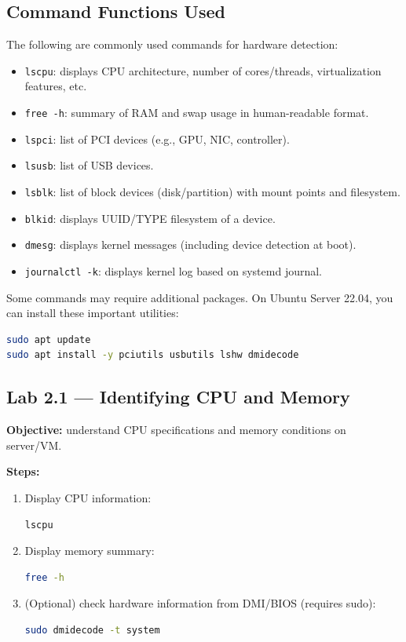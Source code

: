 \subsection*{Command Functions Used}
The following are commonly used commands for hardware detection:
\begin{itemize}
    \item \texttt{lscpu}: displays CPU architecture, number of cores/threads, virtualization features, etc.
    \item \texttt{free -h}: summary of RAM and swap usage in human-readable format.
    \item \texttt{lspci}: list of PCI devices (e.g., GPU, NIC, controller).
    \item \texttt{lsusb}: list of USB devices.
    \item \texttt{lsblk}: list of block devices (disk/partition) with mount points and filesystem.
    \item \texttt{blkid}: displays UUID/TYPE filesystem of a device.
    \item \texttt{dmesg}: displays kernel messages (including device detection at boot).
    \item \texttt{journalctl -k}: displays kernel log based on systemd journal.
\end{itemize}

\begin{tipbox}
Some commands may require additional packages. On Ubuntu Server 22.04, you can install these important utilities:
\begin{lstlisting}[language=bash]
sudo apt update
sudo apt install -y pciutils usbutils lshw dmidecode
\end{lstlisting}
\end{tipbox}

\subsection*{Lab 2.1 --- Identifying CPU and Memory}
\textbf{Objective:} understand CPU specifications and memory conditions on server/VM.

\textbf{Steps:}
\begin{enumerate}
    \item Display CPU information:
\begin{lstlisting}[language=bash, caption={View CPU information}]
lscpu
\end{lstlisting}

    \item Display memory summary:
\begin{lstlisting}[language=bash, caption={View memory usage}]
free -h
\end{lstlisting}

    \item (Optional) check hardware information from DMI/BIOS (requires sudo):
\begin{lstlisting}[language=bash, caption={DMI information (optional)}]
sudo dmidecode -t system
\end{lstlisting}
\end{enumerate}

